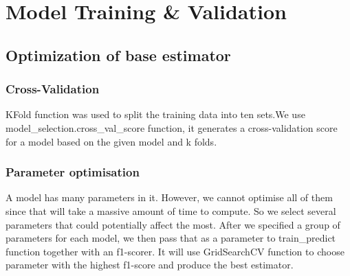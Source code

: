 \documentclass{article}
\begin{document}
\section{Model Training \& Validation}
\subsection{Optimization of base estimator}

\subsubsection{Cross-Validation}
KFold function was used to split the training data into ten sets.We use model\_selection.cross\_val\_score function, it generates a cross-validation score for a model based on the given model and k folds. 

\subsubsection{Parameter optimisation}
A model has many parameters in it. However, we cannot optimise all of them since that will take a massive amount of time to compute. So we select several parameters that could potentially affect the most.
After we specified a group of parameters for each model, we then pass that as a parameter to train\_predict function together with an f1-scorer. It will use GridSearchCV function to choose parameter with the highest f1-score and produce the best estimator. 
\end{document}
